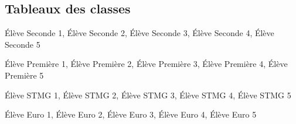 \documentclass[a4paper,french,10pt]{article}
\begin{document}
\newpage

\subsection{Tableaux des classes}


{
  Élève Seconde 1,
  Élève Seconde 2,
  Élève Seconde 3,
  Élève Seconde 4,
  Élève Seconde 5
}

{
  Élève Première 1,
  Élève Première 2,
  Élève Première 3,
  Élève Première 4,
  Élève Première 5
}

{
  Élève STMG 1,
  Élève STMG 2,
  Élève STMG 3,
  Élève STMG 4,
  Élève STMG 5
}

{
  Élève Euro 1,
  Élève Euro 2,
  Élève Euro 3,
  Élève Euro 4,
  Élève Euro 5
}
\end{document}
